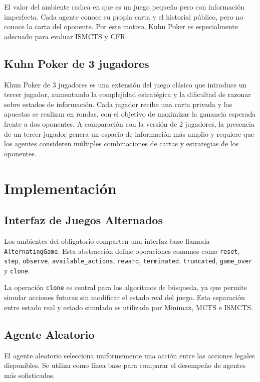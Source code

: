 \documentclass[letterpaper,12pt]{article}
\begin{document}
El valor del ambiente radica en que es un juego pequeño pero con información imperfecta. Cada agente conoce su propia carta y el historial público, pero no conoce la carta del oponente. Por este motivo, Kuhn Poker es especialmente adecuado para evaluar ISMCTS y CFR.

\subsection{Kuhn Poker de 3 jugadores}

Khun Poker de 3 jugadores es una extensión del juego clásico que introduce un tercer jugador, aumentando la complejidad estratégica y la dificultad de razonar sobre estados de información. Cada jugador recibe una carta privada y las apuestas se realizan en rondas, con el objetivo de maximizar la ganancia esperada frente a dos oponentes.
A comparación con la versión de 2 jugadores, la presencia de un tercer jugador genera un espacio de información más amplio y requiere que los agentes consideren múltiples combinaciones de cartas y estrategias de los oponentes.

\clearpage
\section{Implementación}

\subsection{Interfaz de Juegos Alternados}

Los ambientes del obligatorio comparten una interfaz base llamada \texttt{AlternatingGame}. Esta abstracción define operaciones comunes como \texttt{reset}, \texttt{step}, \texttt{observe}, \texttt{available\_actions}, \texttt{reward}, \texttt{terminated}, \texttt{truncated}, \texttt{game\_over} y \texttt{clone}.

La operación \texttt{clone} es central para los algoritmos de búsqueda, ya que permite simular acciones futuras sin modificar el estado real del juego. Esta separación entre estado real y estado simulado es utilizada por Minimax, MCTS e ISMCTS.

\subsection{Agente Aleatorio}

El agente aleatorio selecciona uniformemente una acción entre las acciones legales disponibles. Se utiliza como línea base para comparar el desempeño de agentes más sofisticados.
\end{document}
